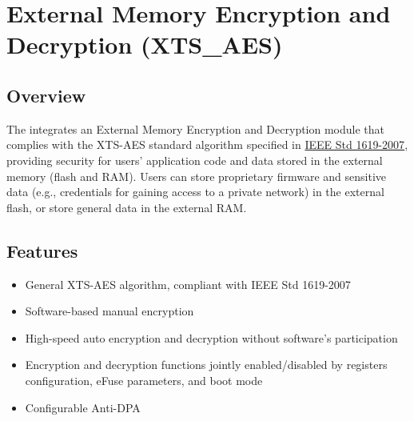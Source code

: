 \documentclass[main\_\_EN.tex]{subfiles}
\begin{document}

\ifglobal
\else
    {\let\clearpage\relax \listoftodos}
    {\let\clearpage\relax \listofdonetodos}
    \tableofcontents
\fi




\hypertarget{extmemencr}{}
\chapter{External Memory Encryption and Decryption (XTS\_AES)}
\label{mod:extmemencr}

\section{Overview}

The \chipname{} integrates an External Memory Encryption and Decryption module that complies with the XTS-AES standard algorithm specified in \href{https://ieeexplore.ieee.org/document/4493450}{IEEE Std 1619-2007}, providing security for users' application code and data stored in the external memory (flash and RAM). Users can store proprietary firmware and sensitive data (e.g., credentials for gaining access to a private network) in the external flash, or store general data in the external RAM.

\section{Features}

\begin{itemize}
    \item General XTS-AES algorithm, compliant with IEEE Std 1619-2007
    \item Software-based manual encryption
    \item High-speed auto encryption and decryption without software's participation
    \item Encryption and decryption functions jointly enabled/disabled by registers configuration, eFuse parameters, and boot mode
    \item Configurable Anti-DPA
\end{itemize}
\end{document}

